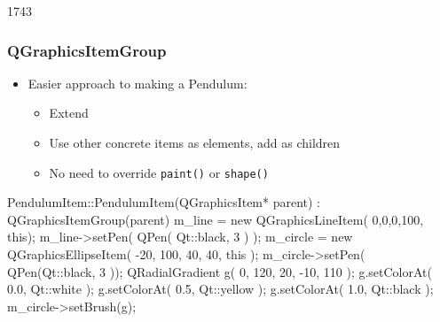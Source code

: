 \begin{slide}[fragile]{1743}
\frametitle{QGraphicsItemGroup}
\begin{itemize}
\item Easier approach to making a Pendulum:
    \begin{itemize}
    \item Extend 

    \item Use other concrete items as elements, add as children
    \item No need to override \texttt{paint()} or \texttt{shape()}
    \end{itemize} 
\end{itemize}
\begin{cpp}
PendulumItem::PendulumItem(QGraphicsItem* parent)
  : QGraphicsItemGroup(parent) { 
  m_line = new QGraphicsLineItem( 0,0,0,100, this);
  m_line->setPen( QPen( Qt::black, 3 ) );
  m_circle = new QGraphicsEllipseItem( -20, 100, 40, 40, this );
  m_circle->setPen( QPen(Qt::black, 3 ));
  QRadialGradient g( 0, 120, 20, -10, 110 );
  g.setColorAt( 0.0, Qt::white );
  g.setColorAt( 0.5, Qt::yellow );
  g.setColorAt( 1.0, Qt::black );
  m_circle->setBrush(g);  
}
\end{cpp}
\end{slide}



